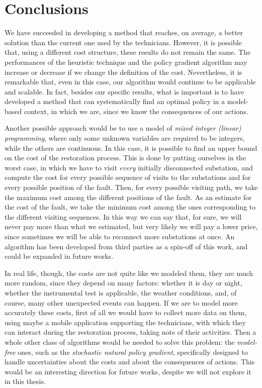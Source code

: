 \chapter{Conclusions}


We have succeeded in developing a method that reaches, on average, a better solution than the current one used by the technicians. However, it is possible that, using a different cost structure, these results do not remain the same. The performances of the heuristic technique and the policy gradient algorithm may increase or decrease if we change the definition of the cost. Nevertheless, it is remarkable that, even in this case, our algorithm would continue to be applicable and scalable. In fact, besides our specific results, what is important is to have developed a method that can systematically find an optimal policy in a model-based context, in which we are, since we know the consequences of our actions.

Another possible approach would be to use a model of \emph{mixed integer (linear) programming}, where only some unknown variables are required to be integers, while the others are continuous. In this case, it is possible to find an upper bound on the cost of the restoration process. This is done by putting ourselves in the worst case, in which we have to visit \emph{every} initially disconnected substation, and compute the cost for every possible sequence of visits to the substations and for every possible position of the fault. Then, for every possible visiting path, we take the maximum cost among the different positions of the fault.
As an estimate for the cost of the fault, we take the minimum cost among the ones corresponding to the different visiting sequences. In this way we can say that, for sure, we will never pay more than what we estimated, but very likely we will pay a lower price, since sometimes we will be able to reconnect more substations at once. An algorithm has been developed from third parties as a spin-off of this work, and could be expanded in future works.

In real life, though, the costs are not quite like we modeled them, they are much more random, since they depend on many factors: whether it is day or night, whether the instrumental test is applicable, the weather conditions, and, of course, many other unexpected events can happen. If we are to model more accurately these costs, first of all we would have to collect more data on them, using maybe a mobile application supporting the technicians, with which they can interact during the restoration process, taking note of their activities. Then a whole other class of algorithms would be needed to solve this problem: the \emph{model-free} ones, such as the \emph{stochastic natural policy gradient}, specifically designed to handle uncertainties about the costs and about the consequences of actions. This would be an interesting direction for future works, despite we will not explore it in this thesis.